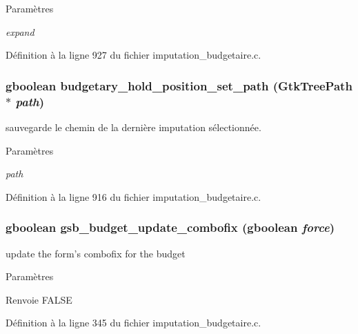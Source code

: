 \begin{DoxyParams}{Paramètres}
\item[{\em expand}]\end{DoxyParams}


Définition à la ligne 927 du fichier imputation\_\-budgetaire.c.

\subsubsection[{budgetary\_\-hold\_\-position\_\-set\_\-path}]{\setlength{\rightskip}{0pt plus 5cm}gboolean budgetary\_\-hold\_\-position\_\-set\_\-path (GtkTreePath $\ast$ {\em path})}\label{imputation__budgetaire_8c_a6228c4caafe41ed3474c70918e98cfac}
sauvegarde le chemin de la dernière imputation sélectionnée.


\begin{DoxyParams}{Paramètres}
\item[{\em path}]\end{DoxyParams}


Définition à la ligne 916 du fichier imputation\_\-budgetaire.c.

\subsubsection[{gsb\_\-budget\_\-update\_\-combofix}]{\setlength{\rightskip}{0pt plus 5cm}gboolean gsb\_\-budget\_\-update\_\-combofix (gboolean {\em force})}\label{imputation__budgetaire_8c_ad363e475c28e0d82a408950418ffb877}
update the form's combofix for the budget


\begin{DoxyParams}{Paramètres}
\item[{\em }]\end{DoxyParams}
\begin{DoxyReturn}{Renvoie}
FALSE 
\end{DoxyReturn}


Définition à la ligne 345 du fichier imputation\_\-budgetaire.c.


